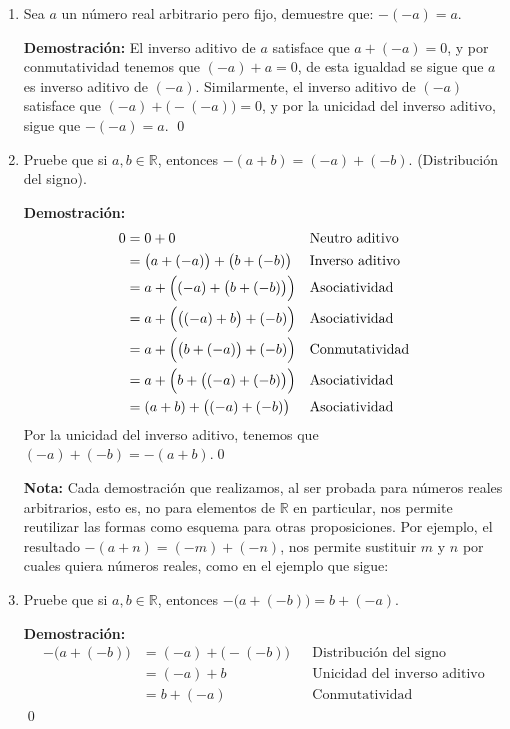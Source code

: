 \documentclass[11pt]{article}
\newcommand{\R}{\mathbb{R}}
\begin{document}
\begin{enumerate}[label=\alph*)]
    \item Sea $a$ un número real arbitrario pero fijo, demuestre que: $-(-a)=a$.
        
    \textbf{Demostración:} El inverso aditivo de $a$ satisface que $a + (-a) = 0$, y por conmutatividad tenemos que $(-a) + a = 0$, de esta igualdad se sigue que $a$ es inverso aditivo de $(-a)$. Similarmente, el inverso aditivo de $(-a)$ satisface que $(-a) + \bigl(-(-a)\bigr) = 0$, y por la unicidad del inverso aditivo, sigue que $-(-a) = a$. \qed

    \item Pruebe que si $a,b\in \R$, entonces $-(a+b)=(-a)+(-b)$. (Distribución del signo).

    \textbf{Demostración:} \begin{align*}
    0 &= 0 + 0 && \text{Neutro aditivo} \\
    &= \bigl(a+(-a)\bigr) + \bigl(b + (-b)\bigr) && \text{Inverso aditivo} \\
    &= a + \Bigl((-a)+ \bigl(b + (-b)\bigr)\Bigr) && \text{Asociatividad} \\
    &= a + \Bigl( \bigl((-a)+b\bigr) +(-b)\Bigr) && \text{Asociatividad} \\
    &= a + \Bigl( \bigl(b+(-a)\bigr) +(-b)\Bigr) && \text{Conmutatividad} \\
    &= a + \Bigl( b + \bigl( (-a)+(-b) \bigr) \Bigr) && \text{Asociatividad} \\
    &= (a+b) + \bigl((-a)+ (-b)\bigr) && \text{Asociatividad}
    \end{align*}
    Por la unicidad del inverso aditivo, tenemos que $(-a)+ (-b)=-(a+b)$.\qed

    \textbf{Nota:} Cada demostración que realizamos, al ser probada para números reales arbitrarios, esto es, no para elementos de $\R$ en particular, nos permite reutilizar las formas como esquema para otras proposiciones. Por ejemplo, el resultado $-(a+n)=(-m)+(-n)$, nos permite sustituir $m$ y $n$ por cuales quiera números reales, como en el ejemplo que sigue:

    \item Pruebe que si $a,b\in \R$, entonces $-\bigl(a+(-b)\bigr)=b+(-a)$.

    \textbf{Demostración:} \begin{align*}
    -\bigl(a+(-b)\bigr)&= (-a) + \bigl(-(-b)\bigr) &&\text{Distribución del signo} \\
    &= (-a) + b &&\text{Unicidad del inverso aditivo} \\
    &= b +(-a) &&\text{Conmutatividad}
    \end{align*} \qed

\end{enumerate}
\end{document}
